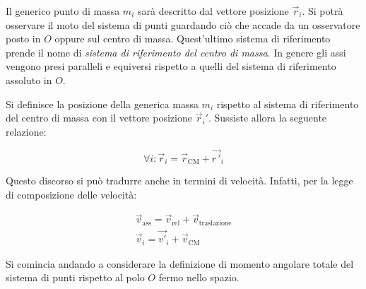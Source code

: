 \begin{figure}[htpb]
\end{figure}
\FloatBarrier
Il generico punto di massa $m_i$ sarà descritto dal vettore posizione $\vec{r}_i$. Si potrà osservare il moto del sistema di punti guardando ciò che accade da un osservatore posto in $O$ oppure sul centro di massa. Quest'ultimo sistema di riferimento prende il nome di \emph{sistema di riferimento del centro di massa}. In genere gli assi vengono presi paralleli e equiversi rispetto a quelli del sistema di riferimento assoluto in $O$.

Si definisce la posizione della generica massa $m_i$ rispetto al sistema di riferimento del centro di massa con il vettore posizione $\vec{r}_i'$. Sussiste allora la seguente relazione:

\[
	\forall i: \vec{r}_i = \vec{r}_\text{CM} + \vec{r\,'}_i
\]

Questo discorso si può tradurre anche in termini di velocità. Infatti, per la legge di composizione delle velocità:

\begin{gather*}
	\vec{v}_{\text{ass} } = \vec{v}_{\text{rel} } + \vec{v}_{\text{traslazione}}\\
	\vec{v}_i = \vec{v'}_i + \vec{v}_\text{CM}
\end{gather*}

Si comincia andando a considerare la definizione di momento angolare totale del sistema di punti rispetto al polo $O$ fermo nello spazio.

